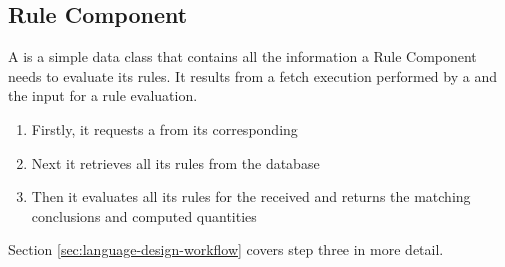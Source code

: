\subsection{Rule Component}\label{subsec:rule-component}
A \REI is a simple data class that contains all the information a Rule Component needs to evaluate its rules.
It results from a fetch execution performed by a \REIF and the input for a rule evaluation.
\begin{enumerate}
    \item Firstly, it requests a \REI from its corresponding \REIF
    \item Next it retrieves all its rules from the database
    \item Then it evaluates all its rules for the received \REI and returns the matching conclusions and computed quantities
\end{enumerate}
Section \ref{sec:language-design-workflow} covers step three in more detail.


